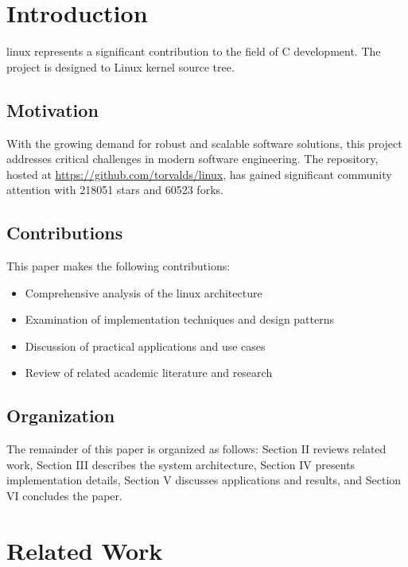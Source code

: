 \documentclass[conference]{IEEEtran}
\begin{document}
\begin{IEEEkeywords}

\end{IEEEkeywords}

\section{Introduction}
\label{sec:introduction}

linux represents a significant contribution to the field of C development. The project is designed to Linux kernel source tree. 

\subsection{Motivation}

With the growing demand for robust and scalable software solutions, this project addresses critical challenges in modern software engineering. The repository, hosted at \url{https://github.com/torvalds/linux}, has gained significant community attention with 218051 stars and 60523 forks.

\subsection{Contributions}

This paper makes the following contributions:

\begin{itemize}
    \item Comprehensive analysis of the linux architecture
    \item Examination of implementation techniques and design patterns
    \item Discussion of practical applications and use cases
    \item Review of related academic literature and research
\end{itemize}

\subsection{Organization}

The remainder of this paper is organized as follows: Section II reviews related work, Section III describes the system architecture, Section IV presents implementation details, Section V discusses applications and results, and Section VI concludes the paper.

\section{Related Work}
\label{sec:related}
\end{document}
